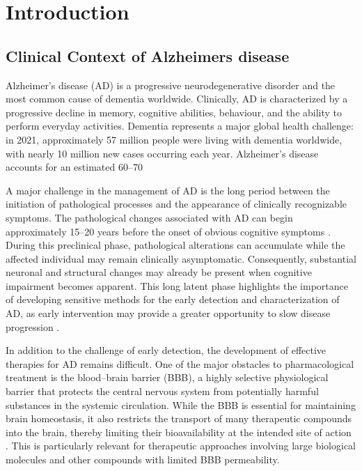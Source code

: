 \chapter{Introduction}
\label{chap:introduction}

\section{Clinical Context of Alzheimers disease}
\label{Clinical Context of Alzheimers disease}
Alzheimer’s disease (AD) is a progressive neurodegenerative disorder and the most common cause of dementia worldwide. Clinically, AD is characterized by a progressive decline in memory, cognitive abilities, behaviour, and the ability to perform everyday activities. Dementia represents a major global health challenge: in 2021, approximately 57 million people were living with dementia worldwide, with nearly 10 million new cases occurring each year. Alzheimer’s disease accounts for an estimated 60--70%

A major challenge in the management of AD is the long period between the initiation of pathological processes and the appearance of clinically recognizable symptoms. The pathological changes associated with AD can begin approximately 15--20 years before the onset of obvious cognitive symptoms \cite{Rafii_Aisen_2023}. During this preclinical phase, pathological alterations can accumulate while the affected individual may remain clinically asymptomatic. Consequently, substantial neuronal and structural changes may already be present when cognitive impairment becomes apparent. This long latent phase highlights the importance of developing sensitive methods for the early detection and characterization of AD, as early intervention may provide a greater opportunity to slow disease progression \cite{Rafii_Aisen_2023}.

In addition to the challenge of early detection, the development of effective therapies for AD remains difficult. One of the major obstacles to pharmacological treatment is the blood--brain barrier (BBB), a highly selective physiological barrier that protects the central nervous system from potentially harmful substances in the systemic circulation. While the BBB is essential for maintaining brain homeostasis, it also restricts the transport of many therapeutic compounds into the brain, thereby limiting their bioavailability at the intended site of action \cite{Iqbal_2024}. This is particularly relevant for therapeutic approaches involving large biological molecules and other compounds with limited BBB permeability.

